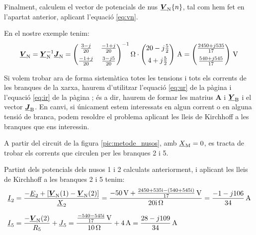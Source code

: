 Finalment,
calculem el vector de potencials de nus $\underline{\boldsymbol{V}}_\mathrm{N}\{n\}$, tal
com  hem fet en l'apartat anterior, aplicant l'equació \eqref{eq:vn}.

En el nostre exemple tenim:
\[
   \mcmplx{V}\ped{N} = \mcmplx{Y}\ped{N}^{-1} \mcmplx{J}\ped{N} =
   \begin{pmatrix}
         \frac{3 - j}{20}  & \frac{-1 + j}{20} \\[2mm]
         \frac{-1 + j}{20} & \frac{3 - j 5}{20}
   \end{pmatrix} ^{-1}\unit{\ohm} \cdot
   \begin{pmatrix}
            20 - j \frac{5}{2} \\[2mm]
            4 + j \frac{5}{2}
   \end{pmatrix}\,\unit{A} =
   \begin{pmatrix}
         \frac{2450 + j 535}{17} \\[2mm]
         \frac{540  + j 545}{17}
   \end{pmatrix}\,\unit{V}
\]

Si volem trobar ara de forma sistemàtica totes les tensions i tots
els corrents   de les branques de la xarxa, haurem d'utilitzar
l'equació \eqref{eq:ur} de la pàgina \pageref{eq:ur} i l'equació
\eqref{eq:ir} de la pàgina \pageref{eq:ir}; és a dir, haurem
de formar les matrius $\boldsymbol{A}$ i $\underline{\boldsymbol{Y}}_\mathrm{B}$ i el
vector $\underline{\boldsymbol{J}}_\mathrm{B}$. En canvi, si únicament estem
interessats en algun corrent o en alguna tensió de branca, podem
resoldre el problema aplicant les lleis de Kirchhoff a les branques
que ens interessin.

	
\begin{exemple}\label{ex:XarxaSenseAcobl}
	\addcontentsxms{\XarxaSenseAcobl}
    A partir del circuit de la figura \vref{pic:metode_nusos}, amb
    $\underline{X}_\mathrm{M}=0$, es tracta de trobar els corrents que circulen
    per les branques 2 i 5.

    Partint dels potencials dels nusos 1 i 2 calculats anteriorment, i
    aplicant les lleis de Kirchhoff a les branques 2 i 5 tenim:
    \begin{align*}
       \cmplx{I}_2 &= \frac{-\cmplx{E}_2 + [\mcmplx{V}\ped{N}(1) - \mcmplx{V}\ped{N}(2)]}
                      {\cmplx{X}_2} = \frac{\qty{-50}{V} + \frac{\complexnum{2450+j535} - (\complexnum{540+
                      j545})}{17}\,\unit{V}}{\complexqty{j20}{\ohm}} = \frac{-1 - j 106}{34}\unit{\,A} \\[1.5ex]
       \cmplx{I}_5 &=  \frac{- \mcmplx{V}\ped{N}(2)}{R_5}  + \cmplx{J}_5 =                       \frac{\frac{\complexnum{-540-j545}}{17}\,\unit{V}}{\qty{10}{\ohm}} + \qty{4}{A} = \frac{28 - j 109}{34}\unit{\,A}
    \end{align*}
\end{exemple}

